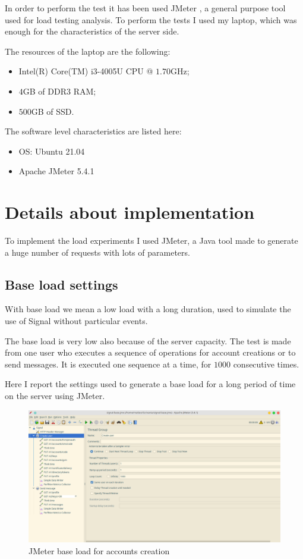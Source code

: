 In order to perform the test it has been used JMeter \cite{apache_jmeter}, a general purpose tool used for load testing analysis.
To perform the tests I used my laptop, which was enough for the characteristics of the server side.

The resources of the laptop are the following:
\begin{itemize}
    \item Intel(R) Core(TM) i3-4005U CPU @ $1.70$GHz;
    \item $4$GB of DDR3 RAM;
    \item $500$GB of SSD.
\end{itemize}

The software level characteristics are listed here:
\begin{itemize}
    \item OS: Ubuntu 21.04
    \item Apache JMeter 5.4.1
\end{itemize}

\section{Details about implementation\label{sec:implementation}}

To implement the load experiments I used JMeter, a Java tool made to generate a huge number of requests with lots of parameters.

\subsection{Base load settings\label{sec:baseloadsettings}}

With base load we mean a low load with a long duration, used to simulate the use of Signal without particular events.

The base load is very low also because of the server capacity. The test is made from one user who executes a sequence of operations for account creations or to send messages. It is executed one sequence at a time, for $1000$ consecutive times.

Here I report the settings used to generate a base load for a long period of time on the server using JMeter.

\begin{figure}[H]
    \centering
    \includegraphics[width=\textwidth]{images/signal-create-base}
    \caption{JMeter base load for accounts creation}
    \label{fig:jmeterbaseuser}
\end{figure}

